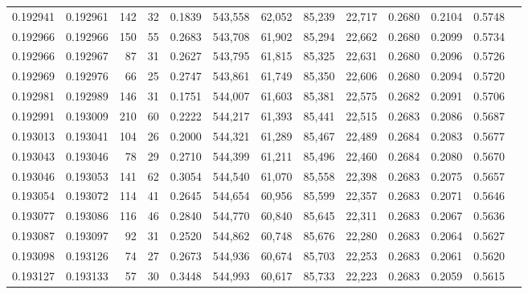 \begin{tabular}{rrrrrrrrrrrrr}
0.192941 & 0.192961 &   142 &  32 &                                     0.1839 & 543,558 &  62,052 &  85,239 &  22,717 & 0.2680 & 0.2104 & 0.5748 \\
0.192966 & 0.192966 &   150 &  55 &                                     0.2683 & 543,708 &  61,902 &  85,294 &  22,662 & 0.2680 & 0.2099 & 0.5734 \\
0.192966 & 0.192967 &    87 &  31 &                                     0.2627 & 543,795 &  61,815 &  85,325 &  22,631 & 0.2680 & 0.2096 & 0.5726 \\
0.192969 & 0.192976 &    66 &  25 &                                     0.2747 & 543,861 &  61,749 &  85,350 &  22,606 & 0.2680 & 0.2094 & 0.5720 \\
0.192981 & 0.192989 &   146 &  31 &                                     0.1751 & 544,007 &  61,603 &  85,381 &  22,575 & 0.2682 & 0.2091 & 0.5706 \\
0.192991 & 0.193009 &   210 &  60 &                                     0.2222 & 544,217 &  61,393 &  85,441 &  22,515 & 0.2683 & 0.2086 & 0.5687 \\
0.193013 & 0.193041 &   104 &  26 &                                     0.2000 & 544,321 &  61,289 &  85,467 &  22,489 & 0.2684 & 0.2083 & 0.5677 \\
0.193043 & 0.193046 &    78 &  29 &                                     0.2710 & 544,399 &  61,211 &  85,496 &  22,460 & 0.2684 & 0.2080 & 0.5670 \\
0.193046 & 0.193053 &   141 &  62 &                                     0.3054 & 544,540 &  61,070 &  85,558 &  22,398 & 0.2683 & 0.2075 & 0.5657 \\
0.193054 & 0.193072 &   114 &  41 &                                     0.2645 & 544,654 &  60,956 &  85,599 &  22,357 & 0.2683 & 0.2071 & 0.5646 \\
0.193077 & 0.193086 &   116 &  46 &                                     0.2840 & 544,770 &  60,840 &  85,645 &  22,311 & 0.2683 & 0.2067 & 0.5636 \\
0.193087 & 0.193097 &    92 &  31 &                                     0.2520 & 544,862 &  60,748 &  85,676 &  22,280 & 0.2683 & 0.2064 & 0.5627 \\
0.193098 & 0.193126 &    74 &  27 &                                     0.2673 & 544,936 &  60,674 &  85,703 &  22,253 & 0.2683 & 0.2061 & 0.5620 \\
0.193127 & 0.193133 &    57 &  30 &                                     0.3448 & 544,993 &  60,617 &  85,733 &  22,223 & 0.2683 & 0.2059 & 0.5615 \\

\end{tabular}
